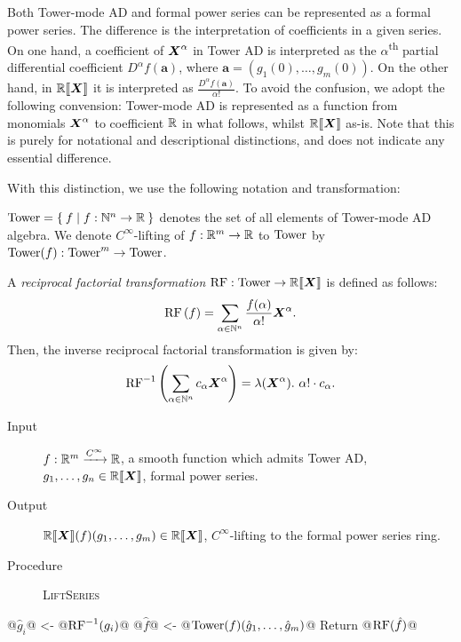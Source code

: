 \documentclass[runningheads]{llncs}
\begin{document}
Both Tower-mode AD and formal power series can be represented as a formal power series.
The difference is the interpretation of coefficients in a given series.
On one hand, a coefficient of $\boldsymbol{X}^\alpha$ in Tower AD is interpreted as the $\alpha$\textsuperscript{th} partial differential coefficient $D^\alpha f(\boldsymbol{a})$, where $\boldsymbol{a} = (g_1(0), \dots, g_m(0))$.
On the other hand, in $\mathord{\mathbb{R}\llbracket\boldsymbol{X}\rrbracket}$ it is interpreted as $\frac{D^\alpha f(\boldsymbol{a})}{\alpha!}$.
To avoid the confusion, we adopt the following convension: Tower-mode AD is represented as a function from monomials $\boldsymbol{X}^\alpha$ to coefficient $\mathbb{R}$ in what follows, whilst $\mathord{\mathbb{R}\llbracket\boldsymbol{X}\rrbracket}$ as-is.
Note that this is purely for notational and descriptional distinctions, and does not indicate any essential difference.

With this distinction, we use the following notation and transformation:

\begin{definition}
  $\mathord{\mathrm{Tower}} = \Set{f | f: \mathbb{N}^n \to \mathbb{R}}$ denotes the set of all elements of Tower-mode AD algebra.
  We denote $C^\infty$-lifting of $f: \mathbb{R}^m \to \mathbb{R}$ to $\mathord{\mathrm{Tower}}$ by $\mathord{\mathrm{Tower}}(f): \mathord{\mathrm{Tower}}^m \to \mathord{\mathrm{Tower}}$.

  A \emph{reciprocal factorial transformation} $\operatorname{RF}: \mathord{\mathrm{Tower}} \to \mathord{\mathbb{R}\llbracket\boldsymbol{X}\rrbracket}$ is defined as follows:
  \[
    \operatorname{RF}\left(f\right)
    = \sum_{\alpha \in \mathbb{N}^n} \frac{f(\alpha)}{\alpha!} \boldsymbol{X}^\alpha.
  \]
  Then, the inverse reciprocal factorial transformation is given by:
  \[
  \operatorname{RF}^{-1}\left(\sum_{\alpha \in \mathbb{N}^n} c_\alpha \boldsymbol{X}^\alpha\right)
  = \lambda (\boldsymbol{X}^\alpha).\ \alpha ! \cdot c_\alpha.
  \]
\end{definition}

\begin{algorithm}\label{lift-series}
\hfill\vspace{-.25em}
\begin{description}
  \item[Input]
    $f: \mathbb{R}^m \xrightarrow{C^\infty} \mathbb{R}$, a smooth function which admits Tower AD,
    $g_1, \dots, g_n \in \mathord{\mathbb{R}\llbracket\boldsymbol{X}\rrbracket}$, formal power series.
  \item[Output] $\mathord{\mathbb{R}\llbracket\boldsymbol{X}\rrbracket}(f)(g_1, \dots, g_m) \in \mathord{\mathbb{R}\llbracket\boldsymbol{X}\rrbracket}$, $C^\infty$-lifting to the formal power series ring.
  \item[Procedure] \textup{\textsc{LiftSeries}}
\end{description}
\begin{alg}
@$\hat{g}_i$@ <- @$\operatorname{RF}^{-1}(g_i)$@
@$\hat{f}$@ <- @$\mathord{\mathrm{Tower}}(f)(\hat{g}_1, \dots, \hat{g}_m)$@
Return @$\operatorname{RF}(\hat{f})$@
\end{alg}
\end{algorithm}
\end{document}
